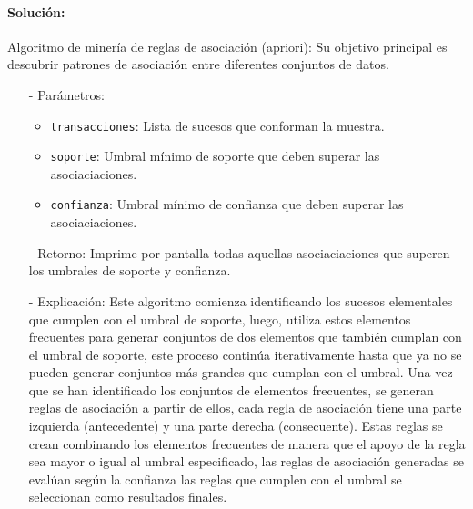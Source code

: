 \documentclass[a4paper, 12pt]{article}
\begin{document}
	\paragraph{Solución:}
			Algoritmo de minería de reglas de asociación (apriori): Su objetivo principal es descubrir patrones de asociación entre diferentes conjuntos de datos.
			\begin{itemize}
				\item[-] Parámetros:
				\begin{itemize}
					\item \texttt{transacciones}: Lista de sucesos que conforman la muestra.
					\item \texttt{soporte}: Umbral mínimo de soporte que deben superar las asociaciaciones.
					\item \texttt{confianza}: Umbral mínimo de confianza que deben superar las asociaciaciones.
				\end{itemize}
				
				\item[-] Retorno: Imprime por pantalla todas aquellas asociaciaciones que superen los umbrales de soporte y confianza.
				
				\item[-] Explicación: Este algoritmo comienza identificando los sucesos elementales que cumplen con el umbral de soporte, luego, utiliza estos elementos frecuentes para generar conjuntos de dos elementos que también cumplan con el umbral de soporte, este proceso continúa iterativamente hasta que ya no se pueden generar conjuntos más grandes que cumplan con el umbral. Una vez que se han identificado los conjuntos de elementos frecuentes, se generan reglas de asociación a partir de ellos, cada regla de asociación tiene una parte izquierda (antecedente) y una parte derecha (consecuente). Estas reglas se crean combinando los elementos frecuentes de manera que el apoyo de la regla sea mayor o igual al umbral especificado, las reglas de asociación generadas se evalúan según la confianza las reglas que cumplen con el umbral se seleccionan como resultados finales.

			\end{itemize}
\end{document}

